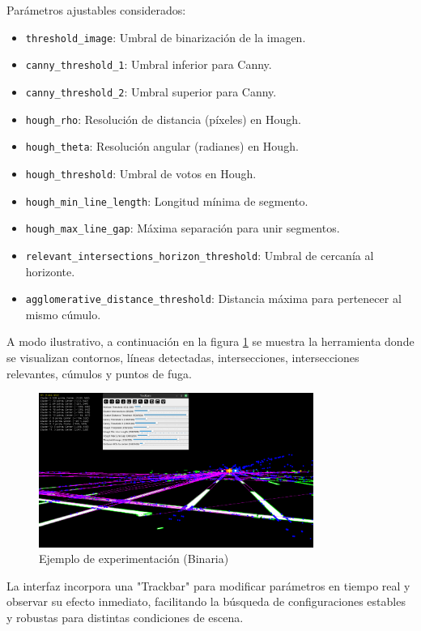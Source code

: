 \noindent
Parámetros ajustables considerados:
\begin{itemize}
	\item \texttt{threshold\_image}: Umbral de binarización de la imagen.
	\item \texttt{canny\_threshold\_1}: Umbral inferior para Canny.
	\item \texttt{canny\_threshold\_2}: Umbral superior para Canny.
	\item \texttt{hough\_rho}: Resolución de distancia (píxeles) en Hough.
	\item \texttt{hough\_theta}: Resolución angular (radianes) en Hough.
	\item \texttt{hough\_threshold}: Umbral de votos en Hough.
	\item \texttt{hough\_min\_line\_length}: Longitud mínima de segmento.
	\item \texttt{hough\_max\_line\_gap}: Máxima separación para unir segmentos.
	\item \texttt{relevant\_intersections\_horizon\_threshold}: Umbral de cercanía al horizonte.
	\item \texttt{agglomerative\_distance\_threshold}: Distancia máxima para pertenecer al mismo cúmulo.
\end{itemize}

\noindent
A modo ilustrativo, a continuación  en la figura \ref{fig:experimentationBinary-teo} 
se muestra la herramienta donde se visualizan contornos, líneas detectadas,
intersecciones, intersecciones relevantes, cúmulos y puntos de fuga.

\begin{figure}[!ht]
	
		\includegraphics[width=0.8\textwidth]{img/reticule/experimentationBinary}
		\caption{Ejemplo de experimentación (Binaria)}
		\label{fig:experimentationBinary-teo}
	
\end{figure}

\noindent
La interfaz incorpora una "Trackbar" para modificar parámetros en tiempo real y observar su efecto inmediato,
facilitando la búsqueda de configuraciones estables y robustas para distintas condiciones de escena.
